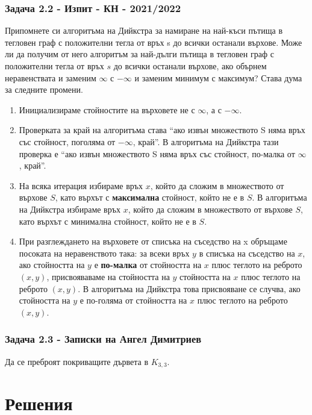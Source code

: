\documentclass[12pt]{article}
\begin{document}
\subsubsection*{Задача 2.2 - Изпит - КН - 2021/2022}
Припомнете си алгоритъма на Дийкстра за намиране на най-къси пътища в тегловен граф с положителни тегла от връх s до всички останали върхове. Може ли да получим от него алгоритъм за най-дълги пътища в тегловен граф с положителни тегла от връх $s$ до всички останали върхове, ако обърнем неравенствата и заменим $\infty$ с $-\infty$ и заменим минимум с максимум? Става дума за следните промени.
\begin{enumerate}
    \item Инициализираме стойностите на върховете не с $\infty$, а с $-\infty$.
    \item Проверката за край на алгоритъма става ``ако извън множеството S няма връх със стойност, поголяма от $-\infty$, край''. В алгоритъма на Дийкстра тази проверка е ``ако извън множеството S няма връх със стойност, по-малка от $\infty$, край''.
    \item На всяка итерация избираме връх $x$, който да сложим в множеството от върхове $S$, като върхът с \textbf{максимална} стойност, който не е в $S$. В алгоритъма на Дийкстра избираме връх $x$, който да сложим в множеството от върхове $S$, като върхът с минимална стойност, който не е в $S$.
    \item При разглеждането на върховете от списъка на съседство на x обръщаме посоката на неравенството така: за всеки връх $y$ в списъка на съседство на $x$, ако стойността на $y$ е \textbf{по-малка} от стойността на $x$ плюс теглото на реброто $(x, y)$, присвояваваме на стойността на $y$ стойността на $x$ плюс теглото на реброто $(x, y)$. В алгоритъма на Дийкстра това присвояване се случва, ако стойността на $y$ е по-голяма от стойността на $x$ плюс теглото на реброто $(x, y)$.
\end{enumerate}
\subsubsection*{Задача 2.3 - Записки на Ангел Димитриев}
Да се преброят покриващите дървета в $K_{3, 3}$.

\section*{Решения}
\end{document}
